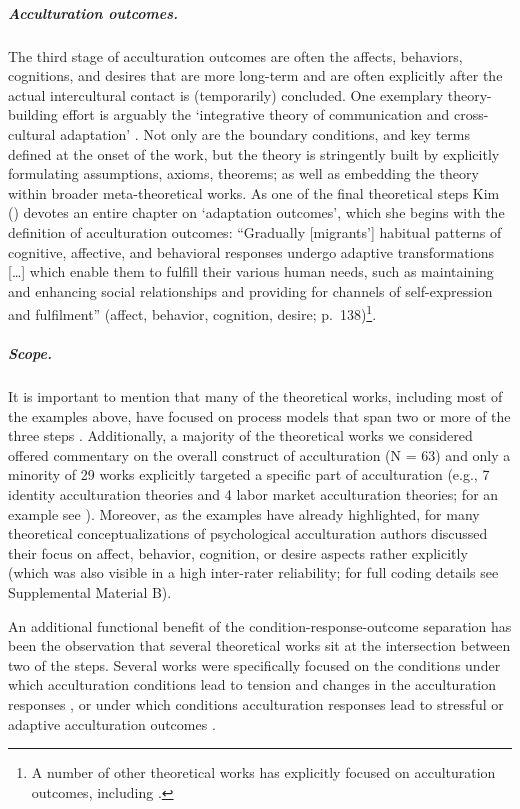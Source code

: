 \subparagraph{Acculturation outcomes.}

The third stage of acculturation outcomes are often the affects,
behaviors, cognitions, and desires that are more long-term and are often
explicitly after the actual intercultural contact is (temporarily)
concluded. One exemplary theory-building effort is arguably the
`integrative theory of communication and cross-cultural adaptation'
\citep[][]{Kim1988}. Not only are the boundary conditions, and key terms
defined at the onset of the work, but the theory is stringently built by
explicitly formulating assumptions, axioms, theorems; as well as
embedding the theory within broader meta-theoretical works. As one of
the final theoretical steps Kim (\citeyear[][]{Kim1988}) devotes an
entire chapter on `adaptation outcomes', which she begins with the
definition of acculturation outcomes: ``Gradually {[}migrants'{]}
habitual patterns of cognitive, affective, and behavioral responses
undergo adaptive transformations {[}\ldots{]} which enable them to
fulfill their various human needs, such as maintaining and enhancing
social relationships and providing for channels of self-expression and
fulfilment'' (affect, behavior, cognition, desire;
p.~138)\footnote{A number of other theoretical works has explicitly focused on acculturation outcomes, including \citet[][]{Baird2015, Berry1998, Berry1992, Berry2005, Riedel2011, Rogler1994, Luedicke2011}.}.

\subparagraph{Scope.}

It is important to mention that many of the theoretical works, including
most of the examples above, have focused on process models that span two
or more of the three steps
\citep[e.g.,][]{Berry1992, Ward2016, Arends-Toth2006a, Rogler1994}.
Additionally, a majority of the theoretical works we considered offered
commentary on the overall construct of acculturation (N = 63) and only a
minority of 29 works explicitly targeted a specific part of
acculturation (e.g., 7 identity acculturation theories and 4 labor
market acculturation theories; for an example see
\citealp{Weinreich2009}). Moreover, as the examples have already
highlighted, for many theoretical conceptualizations of psychological
acculturation authors discussed their focus on affect, behavior,
cognition, or desire aspects rather explicitly (which was also visible
in a high inter-rater reliability; for full coding details see
Supplemental Material B).

An additional functional benefit of the condition-response-outcome
separation has been the observation that several theoretical works sit
at the intersection between two of the steps. Several works were
specifically focused on the conditions under which acculturation
conditions lead to tension and changes in the acculturation responses
\citep[i.e., conditions of change; e.g.,][]{Masgoret2006, Alitolppa-Niitamo2004, Grove1985, Wood2014},
or under which conditions acculturation responses lead to stressful or
adaptive acculturation outcomes
\citep[i.e., conditions of stress; e.g.,][; also see  and Figure S1]{Ryan2008, Berry1992, Benet-Martinez2005, Salo2015, Wood2014, Hajro2019}.

